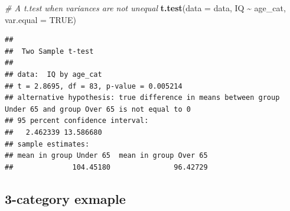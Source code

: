 \documentclass[
]{book}
\newenvironment{Shaded}{\begin{snugshade}}{\end{snugshade}}
\newcommand{\AttributeTok}[1]{\textcolor[rgb]{0.13,0.29,0.53}{#1}}
\newcommand{\CommentTok}[1]{\textcolor[rgb]{0.56,0.35,0.01}{\textit{#1}}}
\newcommand{\ConstantTok}[1]{\textcolor[rgb]{0.56,0.35,0.01}{#1}}
\newcommand{\FunctionTok}[1]{\textcolor[rgb]{0.13,0.29,0.53}{\textbf{#1}}}
\newcommand{\NormalTok}[1]{#1}
\newcommand{\SpecialCharTok}[1]{\textcolor[rgb]{0.81,0.36,0.00}{\textbf{#1}}}
\begin{document}
\begin{Shaded}
\begin{Highlighting}[]
\CommentTok{\# A t.test when variances are not unequal}
\FunctionTok{t.test}\NormalTok{(}\AttributeTok{data =}\NormalTok{ data, IQ }\SpecialCharTok{\textasciitilde{}}\NormalTok{ age\_cat, }\AttributeTok{var.equal =} \ConstantTok{TRUE}\NormalTok{)}
\end{Highlighting}
\end{Shaded}

\begin{verbatim}
## 
##  Two Sample t-test
## 
## data:  IQ by age_cat
## t = 2.8695, df = 83, p-value = 0.005214
## alternative hypothesis: true difference in means between group Under 65 and group Over 65 is not equal to 0
## 95 percent confidence interval:
##   2.462339 13.586680
## sample estimates:
## mean in group Under 65  mean in group Over 65 
##              104.45180               96.42729
\end{verbatim}

\subsection*{3-category exmaple}\label{category-exmaple}
\end{document}
